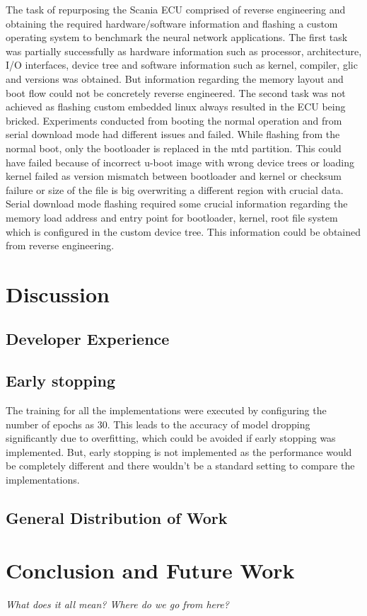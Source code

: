 The task of repurposing the Scania ECU comprised of reverse engineering and obtaining the required hardware/software information and flashing a custom operating system to benchmark the neural network applications.
The first task was partially successfully as hardware information such as processor, architecture, I/O interfaces, device tree and software information such as kernel, compiler, glic and versions was obtained. But information regarding the memory layout and boot flow could not be concretely reverse engineered.
The second task was not achieved as flashing custom embedded linux always resulted in the ECU being bricked. Experiments conducted from booting the normal operation and from serial download mode had different issues and failed. While flashing from the normal boot, only the bootloader is replaced in the mtd partition. This could have failed because of incorrect u-boot image with wrong device trees or loading kernel failed as version mismatch between bootloader and kernel or checksum failure or size of the file is big overwriting a different region with crucial data. Serial download mode flashing required some crucial information regarding the memory load address and entry point for bootloader, kernel, root file system which is configured in the custom device tree. This information could be obtained from reverse engineering.




\chapter{Discussion}


\section{Developer Experience}

\section{Early stopping}
The training for all the implementations were executed by configuring the number of epochs as 30. This leads to the accuracy of model dropping significantly due to overfitting, which could be avoided if early stopping was implemented.
But, early stopping is not implemented as the performance would be completely different and there wouldn't be a standard setting to compare the implementations.

\section{General Distribution of Work}

\chapter{Conclusion and Future Work}
\textit{What does it all mean? Where do we go from here?}
